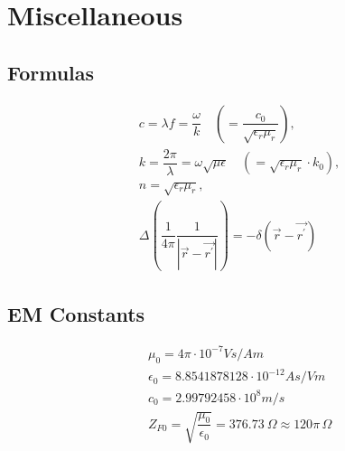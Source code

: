\section{Miscellaneous}
\subsection{Formulas}
\begin{align*}
    &c = \lambda f = \dfrac{\omega}{k} \quad \left(= \dfrac{c_0}{\sqrt{\epsilon_r\mu_r}}\right),\\
    &k = \dfrac{2\pi}{\lambda} = \omega\sqrt{\mu\epsilon} \quad \left(= \sqrt{\epsilon_r\mu_r} \cdot k_0\right),\\
    &n = \sqrt{\epsilon_r\mu_r},\\
    &\Delta\left( \dfrac{1}{4\pi} \dfrac{1}{|\vec{r} - \vec{r^\prime}|} \right) = -\delta(\vec{r} - \vec{r^\prime})
\end{align*}
\subsection{EM Constants}
\begin{align*}
    &\mu_0 = 4\pi \cdot 10^{-7} \si{Vs/Am}\\
    &\epsilon_0 = 8.8541878128 \cdot 10^{-12} \si{As/Vm}\\
    &c_0 = 2.99792458 \cdot 10^8 \si{m/s}\\
    &Z_{F0} = \sqrt{\dfrac{\mu_0}{\epsilon_0}} = \SI{376.73}{\Omega} \approx 120\pi\,\Omega
\end{align*}
